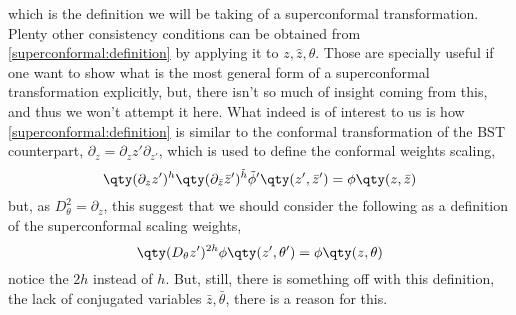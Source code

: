 which is the definition we will be taking of a superconformal transformation. Plenty other consistency conditions can be 
obtained from \cref{superconformal:definition} by applying it to $z,\hat z,\theta$. Those are specially useful if one want to 
show what is the most general form of a superconformal transformation explicitly, but, there isn't so much of insight coming 
from this, and thus we won't attempt it here. What indeed is of interest to us is how \cref{superconformal:definition} is 
similar to the conformal transformation of the BST counterpart, $\partial_z=\partial_z z'\partial_{z'}$, which is used to define the conformal weights scaling,
\[\qty(\partial_z z')^{h}\qty(\partial_{\bar z}{\bar z}')^{\tilde h}{\tilde\phi}'\qty(z',{\bar z}')=\phi\qty(z,\bar z)\]
but, as $D^2_\theta=\partial_z$, this suggest that we should consider the following as a definition of the superconformal scaling 
weights, \[\qty(D_\theta z')^{2h}\phi\qty(z',\theta')=\phi\qty(z,\theta)\] notice the $2h$ instead of $h$. But, still, there 
is something off with this definition, the lack of conjugated variables $\bar z,\bar\theta$, there is a reason for this.